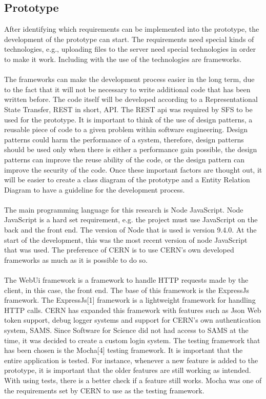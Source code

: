 \documentclass[paper=a4, fontsize=11pt,twoside]{scrartcl}	%
\begin{document}
\subsection{Prototype}
After identifying which requirements can be implemented into the prototype, the development of the prototype can start. The requirements need special kinds of technologies, e.g., uploading files to the server need special technologies in order to make it work. Including with the use of the technologies are frameworks. \\ \\ 
The frameworks can make the development process easier in the long term, due to the fact that it will not be necessary to write additional code that has been written before. The code itself will be developed according to a Representational State Transfer, REST in short, API. The REST api was required by SFS to be used for the prototype. It is important to think of the use of design patterns, a reusable piece of code to a given problem within software engineering. Design patterns could harm the performance of a system, therefore, design patterns should be used only when there is either a performance gain possible, the design patterns can improve the reuse ability of the code, or the design pattern can improve the security of the code. Once these important factors are thought out, it will be easier to create a class diagram of the prototype and a Entity Relation Diagram to have a guideline for the development process. \\ \\
The main programming language for this research is Node JavaScript. Node JavaScript is a hard set requirement, e.g. the project must use JavaScript on the back and the front end. The version of Node that is used is version 9.4.0. At the start of the development, this was the most recent version of node JavaScript that was used. The preference of CERN is to use CERN's own developed frameworks as much as it is possible to do so. \\ \\
The WebUi framework is a framework to handle HTTP requests made by the client, in this case, the front end. The base of this framework is the ExpressJs framework. The ExpressJs[1] framework is a lightweight framework for handling HTTP calls. CERN has expanded this framework with features such as Json Web token support, debug logger systems and support for CERN's own authentication system, SAMS. Since Software for Science did not had access to SAMS at the time, it was decided to create a custom login system. The testing framework that has been chosen is the Mocha[4] testing framework. It is important that the entire application is tested. For instance, whenever a new feature is added to the prototype, it is important that the older features are still working as intended. With using tests, there is a better check if a feature still works. Mocha was one of the requirements set by CERN to use as the testing framework. \\
\end{document}
